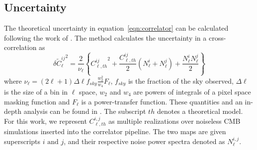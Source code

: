 \documentclass[usenatbib,hidelinks]{mnras}
\begin{document}
{{}
 


\subsection{Uncertainty}\label{sec:uncertainty}{
The theoretical uncertainty in equation~\ref{eqn:correlator} can be calculated following the work of \cite{polenta:2005}. The method calculates the uncertainty in a cross-correlation as
\begin{equation}
{\delta \tilde{C}^{ij}_{\ell}}^{2} = \frac{2}{\nu_{\ell}} \left\lbrace {C_{\ell,th}^{ij}}^{2} + \frac{C^{ij}_{\ell,th}}{2} \left(N_{\ell}^{i} + N_{\ell}^{j} \right) + \frac{N_{\ell}^{i}N_{\ell}^{j}}{2} \right\rbrace  \label{eqn:cross-correlation-variance}
 \end{equation}
 where $\nu_{\ell} = (2\ell + 1)\Delta\ell f_{sky} \frac{w_{2}^{2}}{w_{4}}F_{\ell}$, $f_{sky}$ is the fraction of the sky observed, $\Delta \ell$ is the size of a bin in $\ell$ space, $w_{2}$ and $w_{4}$ are powers of integrals of a pixel space masking function and $F_{\ell}$ is a power-transfer function. These quantities and an in-depth analysis can be found in \citet{Hivon2001}. The subscript $th$ denotes a theoretical model. For this work, we represent $C^{i,j}_{\ell,th}$ as multiple realizations over noiseless CMB simulations inserted into the correlator pipeline. The two maps are given superscripts  $i \text{ and } j$, and their respective noise power spectra denoted as $N_{\ell}^{i,j}$.
 
}}
\end{document}
